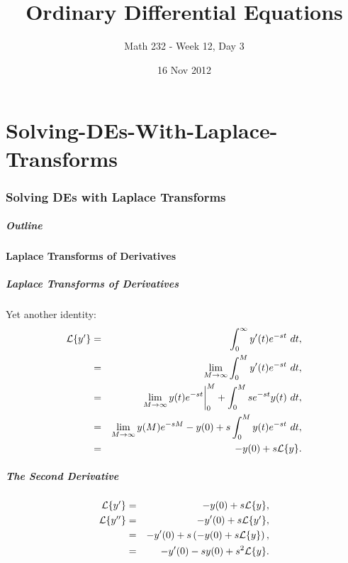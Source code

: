 \part{Solving-DEs-With-Laplace-Transforms}
\section{Solving DEs with Laplace Transforms}

\title{Ordinary Differential Equations}
\subtitle{Math 232 - Week 12, Day 3}
\date{16 Nov 2012}

\begin{frame}
  \titlepage
\end{frame}

\begin{frame}
  \frametitle{Outline}
\end{frame}


\subsection{Laplace Transforms of Derivatives}


\begin{frame}
  \frametitle{Laplace Transforms of Derivatives}

  Yet another identity:
  \begin{eqnarray*}
    \laplace{y'} & = & \int^\infty_0 y'(t) e^{-st} ~ dt, \\
    & = & \lim_{M\rightarrow\infty} \int^M_0 y'(t) e^{-st} ~ dt, \\
    & = & \lim_{M\rightarrow\infty} y(t)e^{-st} \bigg|^M_0 + \int^M_0 s e^{-st} y(t)~dt, \\
    & = & \lim_{M\rightarrow\infty} y(M)e^{-sM} - y(0) + s \int^M_0 y(t) e^{-st} ~dt, \\
    & = & -y(0) + s \laplace{y}.
  \end{eqnarray*}

\end{frame}


\begin{frame}
  \frametitle{The Second Derivative}

  \begin{eqnarray*}
    \laplace{y'} & = & -y(0) + s \laplace{y}, \\
    \laplace{y''} & = & -y'(0) + s \laplace{y'}, \\
    & = & -y'(0) + s \lp -y(0) + s \laplace{y} \rp, \\
    & = & -y'(0) - s y(0) + s^2 \laplace{y}.
  \end{eqnarray*}

\end{frame}


